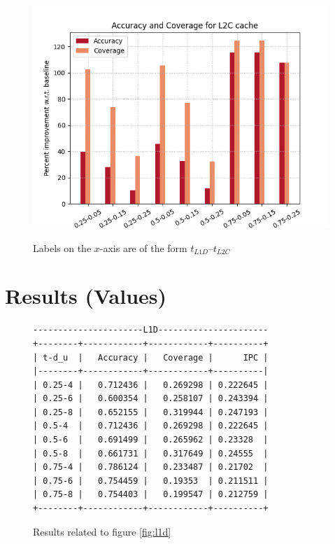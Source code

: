 \documentclass[11pt, swedish, openany]{book}
\begin{document}
\begin{figure}[H]
    \centering
    {\includegraphics[scale = 0.7]{images/combined_L2C.png}}
    \caption{Labels on the $x$-axis are of the form $t_{L1D}$--$t_{L2C}$}
    \label{fig:cl2c}
\end{figure}

\section{Results (Values)}
\label{sec:result_values}

\begin{figure}[H]
    \centering
    \begin{BVerbatim}
----------------------L1D----------------------
+--------+------------+------------+----------+
| t-d_u  |   Accuracy |   Coverage |      IPC |
|--------+------------+------------+----------|
| 0.25-4 |   0.712436 |   0.269298 | 0.222645 |
| 0.25-6 |   0.600354 |   0.258107 | 0.243394 |
| 0.25-8 |   0.652155 |   0.319944 | 0.247193 |
| 0.5-4  |   0.712436 |   0.269298 | 0.222645 |
| 0.5-6  |   0.691499 |   0.265962 | 0.23328  |
| 0.5-8  |   0.661731 |   0.317649 | 0.24555  |
| 0.75-4 |   0.786124 |   0.233487 | 0.21702  |
| 0.75-6 |   0.754459 |   0.19353  | 0.211511 |
| 0.75-8 |   0.754403 |   0.199547 | 0.212759 |
+--------+------------+------------+----------+
    \end{BVerbatim}
    \caption{Results related to figure \ref{fig:l1d}}
\end{figure}
\end{document}
